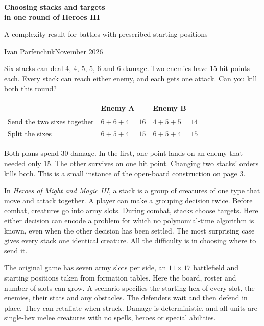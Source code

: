 \documentclass[11pt,a4paper]{article}
\newcommand{\titleline}[1]{{\sffamily\bfseries\fontsize{22}{25}\selectfont #1\par}\vspace{4pt}}
\newcommand{\topic}[1]{\par\addvspace{7pt}{\sffamily\bfseries\large #1\par}\nobreak\vspace{-2pt}}
\begin{document}
\color{ink}\fontsize{10.95}{15}\selectfont
\titleline{Choosing stacks and targets\\in one round of Heroes III}
{\sffamily\color{link}A complexity result for battles with prescribed starting positions}\par\vspace{3pt}
{\large Ivan Parfenchuk}\hfill {\sffamily\small November 2026}\par
\vspace{3pt}

Six stacks can deal 4, 4, 5, 5, 6 and 6 damage. Two enemies have 15 hit points each. Every stack can reach either enemy, and each gets one attack. Can you kill both this round?

\begin{center}
\renewcommand{\arraystretch}{1.25}
\begin{tabular}{@{}lll@{}}
\toprule
 & Enemy A & Enemy B \\ \midrule
Send the two sixes together & $6+6+4=16$ & $4+5+5=14$ \\
Split the sixes & $6+5+4=15$ & $6+5+4=15$ \\ \bottomrule
\end{tabular}
\end{center}

Both plans spend 30 damage. In the first, one point lands on an enemy that needed only 15. The other survives on one hit point. Changing two stacks' orders kills both. This is a small instance of the open-board construction on page 3.

In \emph{Heroes of Might and Magic III}, a stack is a group of creatures of one type that move and attack together. A player can make a grouping decision twice. Before combat, creatures go into army slots. During combat, stacks choose targets. Here either decision can encode a problem for which no polynomial-time algorithm is known, even when the other decision has been settled. The most surprising case gives every stack one identical creature. All the difficulty is in choosing where to send it.

\topic{Which battles does the result cover?}
The original game has seven army slots per side, an $11\times17$ battlefield and starting positions taken from formation tables. Here the board, roster and number of slots can grow. A scenario specifies the starting hex of every slot, the enemies, their stats and any obstacles. The defenders wait and then defend in place. They can retaliate when struck. Damage is deterministic, and all units are single-hex melee creatures with no spells, heroes or special abilities.
\end{document}
